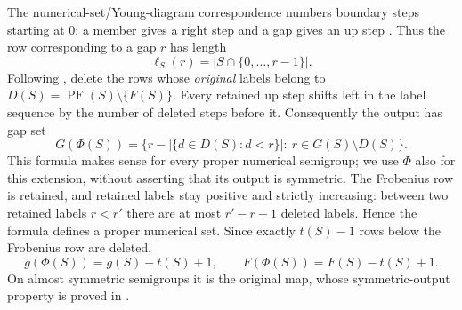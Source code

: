 \documentclass[11pt]{article}
\newcommand{\PF}{\operatorname{PF}}
\begin{document}
The numerical-set/Young-diagram correspondence numbers boundary steps starting
at $0$: a member gives a right step and a gap gives an up step
\cite[Section~2, pp.~4--5]{KN}.
Thus the row corresponding to a gap $r$ has length
\[
 \ell_S(r)=|S\cap\{0,\ldots,r-1\}|.
\]
Following \cite[Theorem~4.2]{DSY}, delete the rows whose \emph{original}
labels belong to $D(S)=\PF(S)\setminus\{F(S)\}$.
Every retained up step shifts left in the label sequence by the number of
deleted steps before it. Consequently the output has gap set
\begin{equation}\label{eq:gaps}
 G(\Phi(S))=
 \bigl\{r-|\{d\in D(S):d<r\}|:\ r\in G(S)\setminus D(S)\bigr\}.
\end{equation}
This formula makes sense for every proper numerical semigroup; we use $\Phi$
also for this extension, without asserting that its output is symmetric.
The Frobenius row is retained, and retained labels stay positive and strictly
increasing: between two retained labels $r<r'$ there are at most $r'-r-1$
deleted labels. Hence the formula defines a proper numerical set.
Since exactly $t(S)-1$ rows below the Frobenius row are deleted,
\begin{equation}\label{eq:shifts}
 g(\Phi(S))=g(S)-t(S)+1,\qquad
 F(\Phi(S))=F(S)-t(S)+1.
\end{equation}
On almost symmetric semigroups it is the original map, whose symmetric-output
property is proved in \cite[Theorem~4.2]{DSY}.
\end{document}

